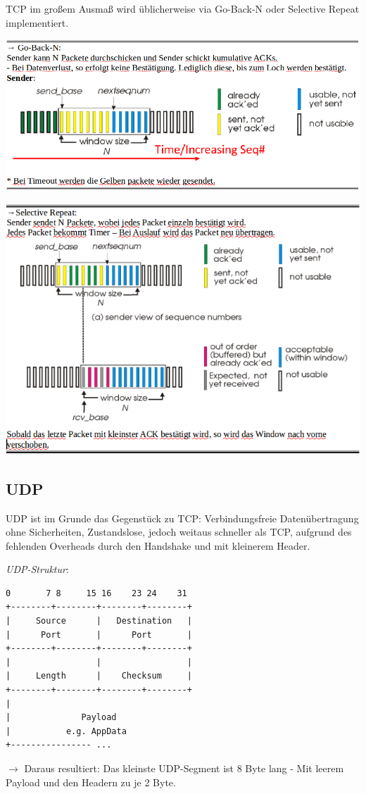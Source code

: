\documentclass{scrartcl}
\begin{document}
    TCP im großem Ausmaß wird üblicherweise via Go-Back-N oder Selective Repeat implementiert.
    \begin{center}
        \includegraphics[width=\textwidth]{GoBackN.png}
    \end{center}
    \begin{center}
        \includegraphics[width=\textwidth]{SelectiveRepeat.png}
    \end{center}

    \subsection{UDP}
    UDP ist im Grunde das Gegenstück zu TCP: Verbindungsfreie Datenübertragung ohne Sicherheiten, Zustandslose, jedoch weitaus schneller als TCP, aufgrund des fehlenden Overheads durch den Handshake und mit kleinerem Header.
    
    \textit{UDP-Struktur}:
    \begin{verbatim}
0       7 8     15 16    23 24    31  
+--------+--------+--------+--------+ 
|     Source      |   Destination   | 
|      Port       |      Port       | 
+--------+--------+--------+--------+ 
|                 |                 | 
|     Length      |    Checksum     | 
+--------+--------+--------+--------+ 
|                                     
|              Payload 
|           e.g. AppData
+---------------- ...                 
    \end{verbatim}
    $\rightarrow$ Daraus resultiert: Das kleinste UDP-Segment ist 8 Byte lang - Mit leerem Payload und den Headern zu je 2 Byte.
    
\end{document}
